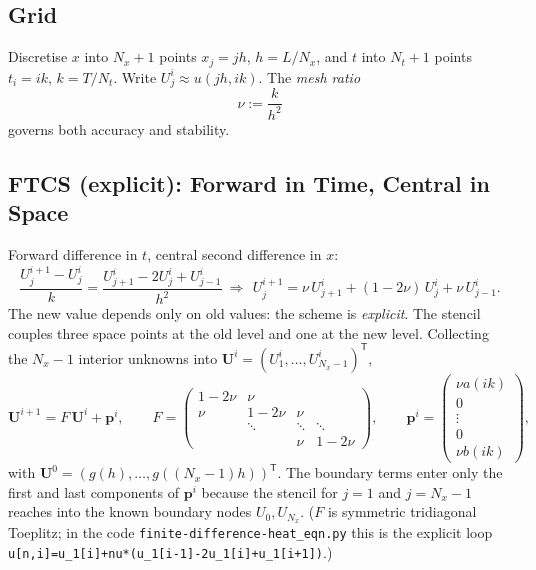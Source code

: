 \documentclass[11pt]{article}
\begin{document}
\subsection{Grid}
Discretise $x$ into $N_x+1$ points $x_j=jh$, $h=L/N_x$, and $t$ into $N_t+1$ points $t_i=ik$, $k=T/N_t$. Write $U^i_j\approx u(jh,ik)$. The \emph{mesh ratio}
\begin{equation}
\nu := \frac{k}{h^2}
\label{eq:nu}
\end{equation}
governs both accuracy and stability.

\subsection{FTCS (explicit): Forward in Time, Central in Space}
Forward difference in $t$, central second difference in $x$:
\begin{equation}
\frac{U^{i+1}_j-U^i_j}{k} = \frac{U^i_{j+1}-2U^i_j+U^i_{j-1}}{h^2}
\ \Longrightarrow\
\boxed{\,U^{i+1}_j = \nu\,U^i_{j+1} + (1-2\nu)\,U^i_j + \nu\,U^i_{j-1}.}
\label{eq:ftcs}
\end{equation}
The new value depends only on old values: the scheme is \emph{explicit}. The stencil couples three space points at the old level and one at the new level. Collecting the $N_x-1$ interior unknowns into $\mathbf U^i=(U^i_1,\dots,U^i_{N_x-1})^{\mathsf T}$,
\begin{equation}
\mathbf U^{i+1} = F\,\mathbf U^i + \mathbf p^i,\qquad
F = \begin{pmatrix}
1-2\nu & \nu & & \\
\nu & 1-2\nu & \nu & \\
 & \ddots & \ddots & \ddots \\
 & & \nu & 1-2\nu
\end{pmatrix},\qquad
\mathbf p^i=\begin{pmatrix}\nu a(ik)\\ 0\\ \vdots\\ 0\\ \nu b(ik)\end{pmatrix},
\label{eq:ftcsmat}
\end{equation}
with $\mathbf U^0=(g(h),\dots,g((N_x-1)h))^{\mathsf T}$. The boundary terms enter only the first and last components of $\mathbf p^i$ because the stencil for $j=1$ and $j=N_x-1$ reaches into the known boundary nodes $U_0,U_{N_x}$. ($F$ is symmetric tridiagonal Toeplitz; in the code \texttt{finite-difference-heat\_eqn.py} this is the explicit loop \texttt{u[n,i]=u\_1[i]+nu*(u\_1[i-1]-2u\_1[i]+u\_1[i+1])}.)
\end{document}
